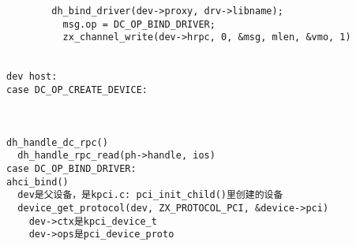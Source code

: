 \begin{verbatim}
        dh_bind_driver(dev->proxy, drv->libname);
          msg.op = DC_OP_BIND_DRIVER;
          zx_channel_write(dev->hrpc, 0, &msg, mlen, &vmo, 1)


dev host:
case DC_OP_CREATE_DEVICE:
  


dh_handle_dc_rpc()
  dh_handle_rpc_read(ph->handle, ios)
case DC_OP_BIND_DRIVER:
ahci_bind()
  dev是父设备，是kpci.c: pci_init_child()里创建的设备
  device_get_protocol(dev, ZX_PROTOCOL_PCI, &device->pci)
    dev->ctx是kpci_device_t
    dev->ops是pci_device_proto
  
\end{verbatim}